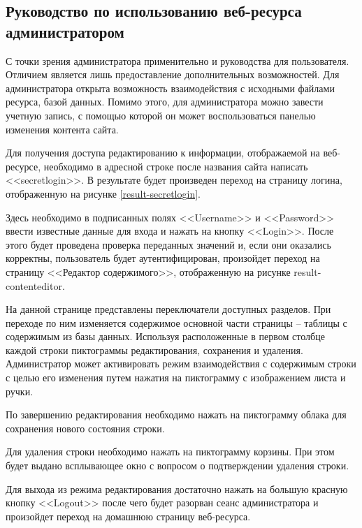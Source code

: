 
\subsection{Руководство по использованию веб-ресурса администратором}

С точки зрения администратора применительно и руководства для пользователя.
Отличием является лишь предоставление дополнительных возможностей.
Для администратора открыта возможность взаимодействия с исходными файлами ресурса, базой данных.
Помимо этого, для администратора можно завести учетную запись, с помощью которой он может воспользоваться панелью изменения контента сайта.

Для получения доступа редактированию к информации, отображаемой на веб-ресурсе, необходимо в адресной строке после названия сайта написать <<secretlogin>>.
В результате будет произведен переход на страницу логина, отображенную на рисунке \ref{result-secretlogin}.


Здесь необходимо в подписанных полях <<Username>> и <<Password>> ввести известные данные для входа и нажать на кнопку <<Login>>.
После этого будет проведена проверка переданных значений и, если они оказались корректны, пользователь будет аутентифицирован, произойдет переход на страницу <<Редактор содержимого>>, отображенную на рисунке {result-contenteditor}.


На данной странице представлены переключатели доступных разделов.
При переходе по ним изменяется содержимое основной части страницы -- таблицы с содержимым из базы данных.
Используя расположенные в первом столбце каждой строки пиктограммы редактирования, сохранения и удаления.
Администратор может активировать режим взаимодействия с содержимым строки с целью его изменения путем нажатия на пиктограмму с изображением листа и ручки.

По завершению редактирования необходимо нажать на пиктограмму облака для сохранения нового состояния строки.

Для удаления строки необходимо нажать на пиктограмму корзины.
При этом будет выдано всплывающее окно с вопросом о подтверждении удаления строки.

Для выхода из режима редактирования достаточно нажать на большую красную кнопку <<Logout>> после чего будет разорван сеанс администратора и произойдет переход на домашнюю страницу веб-ресурса.

\clearpage
